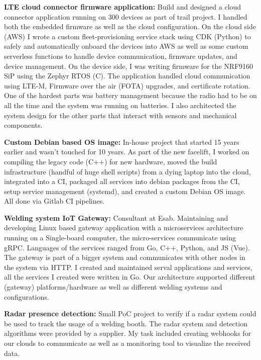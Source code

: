 

\SmallSep
\textbf{LTE cloud connector firmware application:} Build and designed a cloud connector application running on 300 devices as part of trail project. I handled both the embedded firmware as well as the cloud configuration. On the cloud side (AWS) I wrote a custom fleet-provisioning service stack using CDK (Python) to safely and automatically onboard the devices into AWS as well as some custom serverless functions to handle device communication, firmware updates, and device management. On the device side, I was writing firmware for the NRF9160 SiP using the Zephyr RTOS (C). The application handled cloud communication using LTE-M, Firmware over the air (FOTA) upgrades, and certificate rotation. One of the hardest parts was battery management because the radio had to be on all the time and the system was running on batteries. I also architected the system design for the other parts that interact with sensors and mechanical components.  
\SmallSep

\textbf{Custom Debian based OS image:} In-house project that started 15 years earlier and wasn't touched for 10 years. As part of the new facelift, I worked on compiling the legacy code (C++) for new hardware, moved the build infrastructure (handful of huge shell scripts) from a dying laptop into the cloud, integrated into a CI, packaged all services into debian packages from the CI, setup service management (systemd), and created a custom Debian OS image. All done via Gitlab CI pipelines.
\SmallSep

\textbf{Welding system IoT Gateway:} Consultant at Esab. Maintaining and developing Linux based gateway application with a microservices architecture running on a Single-board computer, the micro-services communicate using gRPC. Languages of the services ranged from Go, C++, Python, and JS (Vue). The gateway is part of a bigger system and communicates with other nodes in the system via HTTP. I created and maintained serval applications and services, all the services I created were written in Go. Our architecture supported different (gateway) platforms/hardware as well as different welding systems and configurations.
\SmallSep 

\textbf{Radar presence detection:} Small PoC project to verify if a radar system could be used to track the usage of a welding booth. The radar system and detection algorithms were provided by a supplier. My task included creating webhooks for our clouds to communicate as well as a monitoring tool to visualize the received data. 
\SmallSep


